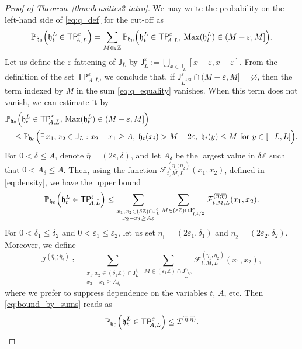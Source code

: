 \documentclass[oneside,final,11pt]{amsart}
\theoremstyle{definition}
\newcommand{\fh}{\mathfrak{h}}
\newcommand{\TP}[1]{\mathsf{TP}_{\!\!#1}}
\newcommand{\bJ}{\mathsf{J}}
\newcommand{\zz}{\mathbb{Z}}
\newcommand{\dens}{\CF}
\newcommand{\1}[1]{\mathbf{1}_{#1}}
\newcommand{\eps}{\varepsilon}
\newcommand{\Max}{\mathrm{Max}}
\newcommand{\CI}{\mathcal{I}}
\newcommand{\CF}{\mathcal{F}}
\renewcommand{\P}{\mathbb P}
\let\emptyset\varnothing
\numberwithin{equation}{section}
\begin{document}
\begin{proof}[Proof of Theorem~\ref{thm:densities2-intro}]
We may write the probability on the left-hand side of \eqref{eq:q_def} for the cut-off as
\begin{align}\label{eq:q_equality}
\P_{\fh_0} \Bigl(\fh^L_t \in \TP{A, \bar L}^{\eps}\Bigr) = \sum_{M \in \eps \zz} \P_{\fh_0} \Bigl(\fh^L_t \in \TP{A, \bar L}^{\eps},\, \Max(\fh^L_t) \in (M-\eps, M]\Bigr).
\end{align}
Let us define the $\eps$-fattening of $\bJ_{\bar L}$ by $\bJ_{\bar L}^{\eps} := \bigcup_{x \in \bJ_{\bar L}} [x - \eps, x + \eps]$. From the definition of the set $\TP{A, \bar L}^{\eps}$, we conclude that, if $\bJ_{\bar L^{1/2}}^{\eps} \cap (M-\eps, M] = \emptyset$, then the term indexed by $M$ in the sum \eqref{eq:q_equality} vanishes. When this term does not vanish, we can estimate it by
\begin{align}
&\P_{\fh_0} \Bigl(\fh^L_t \in \TP{A, \bar L}^{\eps},\, \Max(\fh^L_t) \in (M-\eps, M]\Bigr) \\
&\quad \leq \P_{\fh_0} \Bigl(\exists\, x_1, x_2 \in \bJ_{L} : x_2 - x_1 \geq A,\; \fh_{t}(x_i) > M - 2 \eps,\; \fh_{t}(y) \leq M ~\text{for}~ y \in [- L,  L]\Bigr).
\end{align}
For $0 < \delta \leq A$, denote $\overline \eta = (2 \eps, \delta)$, and let $A_\delta$ be the largest value in $\delta \zz$ such that $0 < A_\delta \leq A$. Then, using the function $\dens_{t, M, L}^{(\eta_1; \eta_2)}(x_1, x_2)$, defined in \eqref{eq:density}, we have the upper bound
\begin{equation}\label{eq:bound_by_sums}
\P_{\fh_0} \Bigl(\fh^L_t \in \TP{A, \bar L}^{\eps}\Bigr) \leq \sum_{\substack{x_1, x_2 \in (\delta \zz) \cap \bJ_{ L}^{\delta} \\ x_2 - x_1 \geq A_\delta}} \sum_{M \in (\eps \zz) \cap \bJ_{\bar L^{1/2}}^{\eps}} \dens^{(\overline\eta; \overline\eta)}_{t, M, L}(x_1, x_2).
\end{equation}
For $0 < \delta_1 \leq \delta_2$ and $0 < \eps_1 \leq \eps_2$, let us set $\overline \eta_1 = (2 \eps_1, \delta_1)$ and $\overline \eta_2 = (2 \eps_2, \delta_2)$. Moreover, we define
\begin{equation}
	\CI^{(\overline\eta_1; \overline\eta_2)} := \sum_{\substack{x_1, x_2 \in (\delta_1 \zz) \cap \bJ_{ L}^{\delta_1} \\ x_2 - x_1 \geq A_{\delta_1}}} \sum_{M \in (\eps_1 \zz) \cap \bJ_{\bar L^{1/2}}^{\eps_1}} \dens^{(\overline\eta_1; \overline\eta_2)}_{t, M, L}(x_1, x_2),
\end{equation}
where we prefer to suppress dependence on the variables $t$, $A$, etc. Then \eqref{eq:bound_by_sums} reads as
\begin{equation}
\P_{\fh_0} \Bigl(\fh^L_t \in \TP{A, \bar L}^{\eps}\Bigr) \leq \CI^{(\overline\eta; \overline\eta)}.
\end{equation}


\end{proof}
\end{document}

